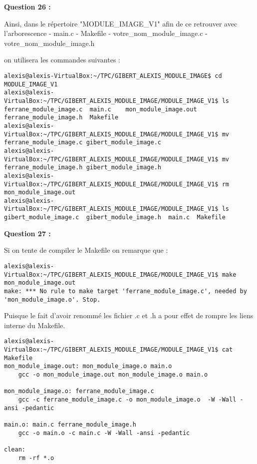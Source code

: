 \documentclass[11pt]{article}
\begin{document}
\textbf{Question 26 :}

Ainsi, dans le répertoire "MODULE\_IMAGE\_V1" afin de ce retrouver avec
l'arborescence - main.c - Makefile - votre\_nom\_module\_image.c -
votre\_nom\_module\_image.h

on utilisera les commandes suivantes :

\begin{verbatim}
alexis@alexis-VirtualBox:~/TPC/GIBERT_ALEXIS_MODULE_IMAGE$ cd MODULE_IMAGE_V1
alexis@alexis-VirtualBox:~/TPC/GIBERT_ALEXIS_MODULE_IMAGE/MODULE_IMAGE_V1$ ls
ferrane_module_image.c  main.c    mon_module_image.out
ferrane_module_image.h  Makefile
alexis@alexis-VirtualBox:~/TPC/GIBERT_ALEXIS_MODULE_IMAGE/MODULE_IMAGE_V1$ mv ferrane_module_image.c gibert_module_image.c
alexis@alexis-VirtualBox:~/TPC/GIBERT_ALEXIS_MODULE_IMAGE/MODULE_IMAGE_V1$ mv ferrane_module_image.h gibert_module_image.h
alexis@alexis-VirtualBox:~/TPC/GIBERT_ALEXIS_MODULE_IMAGE/MODULE_IMAGE_V1$ rm mon_module_image.out
alexis@alexis-VirtualBox:~/TPC/GIBERT_ALEXIS_MODULE_IMAGE/MODULE_IMAGE_V1$ ls
gibert_module_image.c  gibert_module_image.h  main.c  Makefile
\end{verbatim}

\textbf{Question 27 :}

Si on tente de compiler le Makefile on remarque que :

\begin{verbatim}
alexis@alexis-VirtualBox:~/TPC/GIBERT_ALEXIS_MODULE_IMAGE/MODULE_IMAGE_V1$ make mon_module_image.out
make: *** No rule to make target 'ferrane_module_image.c', needed by 'mon_module_image.o'. Stop.
\end{verbatim}

Puisque le fait d'avoir renommé les fichier .c et .h a pour effet de
rompre les liens interne du Makefile.

\begin{verbatim}
alexis@alexis-VirtualBox:~/TPC/GIBERT_ALEXIS_MODULE_IMAGE/MODULE_IMAGE_V1$ cat Makefile 
mon_module_image.out: mon_module_image.o main.o
    gcc -o mon_module_image.out mon_module_image.o main.o

mon_module_image.o: ferrane_module_image.c 
    gcc -c ferrane_module_image.c -o mon_module_image.o  -W -Wall -ansi -pedantic

main.o: main.c ferrane_module_image.h
    gcc -o main.o -c main.c -W -Wall -ansi -pedantic
    
clean:
    rm -rf *.o
\end{verbatim}
\end{document}
